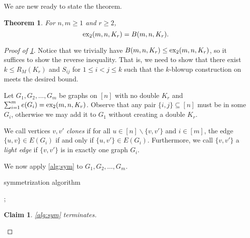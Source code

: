 \documentclass[12pt]{report}
\newtheorem{theorem}{Theorem}[chapter]
\newtheorem{claim}{Claim}[theorem]
\newcommand*{\dex}{\textnormal{ex}_2}
\begin{document}
We are new ready to state the theorem.

\begin{theorem}\label{thm:complete-blowup}
  For $n, m \geq 1$ and $r \geq 2$, 
  \[
    \dex(m, n, K_r) = B(m, n, K_r).
  \]
\end{theorem}

\begin{proof}[Proof of \cref{thm:complete-blowup}]
  Notice that we trivially have $B(m, n, K_r) \leq \dex(m, n, K_r)$, so it suffices to show the reverse inequality. That is, we need to show that there exist $k \leq R_{M}(K_r)$ and $S_{ij}$ for $1 \leq i < j \leq k$ such that the $k$-blowup construction on meets the desired bound.

  Let $G_1, G_2, \ldots, G_m$ be graphs on $[n]$ with no double $K_r$ and $\sum_{i = 1}^m e(G_i) = \dex(m, n, K_r)$. Observe that any pair $\{i, j\} \subseteq [n]$ must be in some $G_i$, otherwise we may add it to $G_1$ without creating a double $K_r$. 

  We call vertices $v, v'$ \textit{clones} if for all $u \in [n] \backslash \{v, v'\}$ and $i \in [m]$, the edge $\{u, v\} \in E(G_i)$ if and only if $\{u, v'\} \in E(G_i)$. Furthermore, we call $\{v, v'\}$ a \textit{light edge} if $\{v, v'\}$ is in exactly one graph $G_i$.

  We now apply \cref{alg:sym} to $G_1, G_2, \ldots, G_m$. 

  \begin{algorithm}[H]
    \caption{symmetrization algorithm}\label{alg:sym}
    \begin{algorithmic}
      \;
      \;
      \;
      \;
      \;
      ;
      \;
          \;
      \EndIf		
      \EndFor
      \EndWhile
      \EndWhile
    \end{algorithmic}
  \end{algorithm}

  \begin{claim}
    \cref{alg:sym} terminates.
  \end{claim}


\end{proof}
\end{document}
